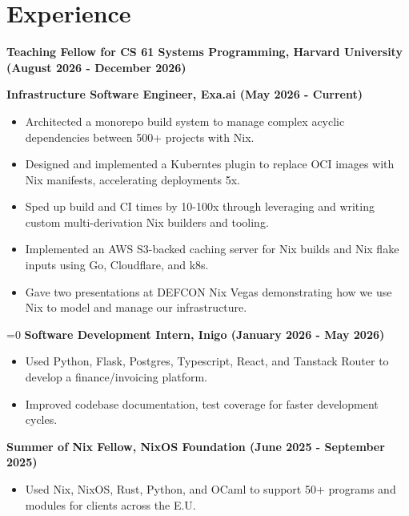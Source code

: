 \section{Experience}

\textbf{Teaching Fellow for CS 61 Systems Programming, Harvard University \hfill (August 2026 - December 2026)}

\textbf{Infrastructure Software Engineer, Exa.ai \hfill (May 2026 - Current)}

\begin{itemize}[noitemsep]
    \item Architected a monorepo build system to manage complex acyclic dependencies between 500+ projects with Nix.
    \item Designed and implemented a Kuberntes plugin to replace OCI images with Nix manifests, accelerating deployments 5x.
    \item Sped up build and CI times by 10-100x through leveraging and writing custom multi-derivation Nix builders and tooling.
    \item Implemented an AWS S3-backed caching server for Nix builds and Nix flake inputs using Go, Cloudflare, and k8s.
    \item Gave two presentations at DEFCON Nix Vegas demonstrating how we use Nix to model and manage our infrastructure.
\end{itemize}

\ifnum{}=0
\textbf{Software Development Intern, Inigo \hfill (January 2026 - May 2026)}

\begin{itemize}[noitemsep]
    \item Used Python, Flask, Postgres, Typescript, React, and Tanstack Router to develop a finance/invoicing platform.
    \item Improved codebase documentation, test coverage for faster development cycles.
\end{itemize}
\fi

\textbf{Summer of Nix Fellow, NixOS Foundation \hfill (June 2025 - September 2025)}

\begin{itemize}[noitemsep]
    \item Used Nix, NixOS, Rust, Python, and OCaml to support 50+ programs and modules for clients across the E.U.
\end{itemize}

